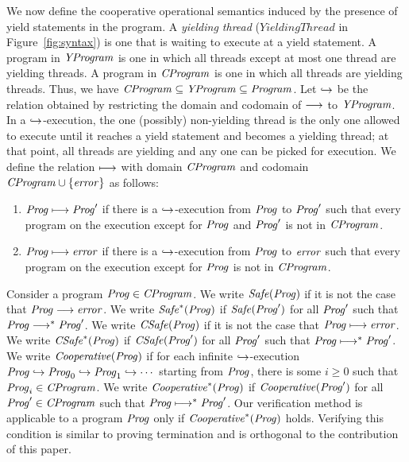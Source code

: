We now define the cooperative operational semantics induced by the presence of yield statements in the program.
A {\em yielding thread\/} ($\mathit{YieldingThread}$ in Figure~\ref{fig:syntax}) is one that is waiting to execute at a yield statement.
A program in $\mathit{YProgram}$ is one in which all threads except at most one thread are yielding threads.
A program in $\mathit{CProgram}$ is one in which all threads are yielding threads.
Thus, we have $\mathit{CProgram} \subseteq \mathit{YProgram} \subseteq \mathit{Program}$.
Let $\hookrightarrow$ be the relation obtained by restricting the domain and codomain of $\longrightarrow$ to $\mathit{YProgram}$.
In a $\hookrightarrow$-execution, the one (possibly) non-yielding thread is the only one allowed to execute until it reaches 
a yield statement and becomes a yielding thread; at that point, all threads are yielding and any one can be picked for execution.
We define the relation $\longmapsto$ with domain $\mathit{CProgram}$ and codomain $\mathit{CProgram} \cup \{\mathit{error}\}$ as follows:
\begin{enumerate}
\item 
$\mathit{Prog} \longmapsto \mathit{Prog}'$ if there is a $\hookrightarrow$-execution from $\mathit{Prog}$ to $\mathit{Prog}'$ such that every program on the execution 
except for $\mathit{Prog}$ and $\mathit{Prog}'$ is not in $\mathit{CProgram}$.
\item
$\mathit{Prog} \longmapsto \mathit{error}$ if there is a $\hookrightarrow$-execution from $\mathit{Prog}$ to $\mathit{error}$ such that every program on the execution 
except for $\mathit{Prog}$ is not in $\mathit{CProgram}$.
\end{enumerate}

Consider a program $\mathit{Prog} \in \mathit{CProgram}$.
We write $\mathit{Safe}(\mathit{Prog})$ if it is not the case that $\mathit{Prog} \longrightarrow \mathit{error}$.
We write $\mathit{Safe}^*(\mathit{Prog})$ if $\mathit{Safe}(\mathit{Prog}')$ for all $\mathit{Prog}'$ such that $\mathit{Prog} \longrightarrow^* \mathit{Prog}'$.
We write $\mathit{CSafe}(\mathit{Prog})$ if it is not the case that $\mathit{Prog} \longmapsto \mathit{error}$.
We write $\mathit{CSafe}^*(\mathit{Prog})$ if $\mathit{CSafe}(\mathit{Prog}')$ for all $\mathit{Prog}'$ such that $\mathit{Prog} \longmapsto^* \mathit{Prog}'$.
We write $\mathit{Cooperative}(\mathit{Prog})$ if for each infinite $\hookrightarrow$-execution $\mathit{Prog} \hookrightarrow \mathit{Prog}_0 \hookrightarrow \mathit{Prog}_1 \hookrightarrow \cdots$ 
starting from $\mathit{Prog}$, there is some $i \geq 0$ such that $\mathit{Prog}_i \in \mathit{CProgram}$.
We write $\mathit{Cooperative}^*(\mathit{Prog})$ if $\mathit{Cooperative}(\mathit{Prog}')$ for all $\mathit{Prog}' \in \mathit{CProgram}$ such that $\mathit{Prog} \longmapsto^* \mathit{Prog}'$.
Our verification method is applicable to a program $\mathit{Prog}$ only if $\mathit{Cooperative}^*(\mathit{Prog})$ holds.
Verifying this condition is similar to proving termination and is orthogonal to the contribution of this paper.
